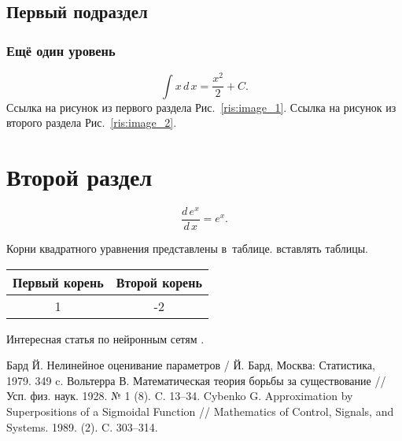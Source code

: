 \documentclass{bacgost}
\begin{document}
\subsection{Первый подраздел}

\subsubsection{Ещё один уровень}
\[
\int x\,d\,x = \dfrac{x^2}{2} + C.
\]
Ссылка на рисунок из первого раздела Рис.~\ref{ris:image_1}.
Ссылка на рисунок из второго раздела Рис.~\ref{ris:image_2}.


\section{Второй раздел}
\[
\dfrac{d\,e^x}{d\,x} = e^x.
\]
\begin{gostfigure}
	\begin{center}
		\label{ris:image_2}
	\end{center}
\end{gostfigure}

Корни квадратного уравнения представлены в~таблице. вставлять таблицы.
\begin{gosttable}
	\begin{center}
		\begin{tabular}{|c|c|}
			\hline
			Первый корень &  Второй корень \\
			\hline
			1 & -2  \\
			\hline
		\end{tabular}
	\end{center}
\end{gosttable}

Интересная статья по нейронным сетям \cite{Cybenko}.


\begin{gostbibliography}{11}
 Бард Й. Нелинейное оценивание параметров / Й. Бард, Москва: Статистика, 1979. 349 c.
 Вольтерра В. Математическая теория борьбы за существование // Усп. физ. наук. 1928. № 1 (8). C. 13–34.
 Cybenko G. Approximation by Superpositions of a Sigmoidal Function // Mathematics of Control, Signals, and Systems. 1989. (2). C. 303–314.
\end{gostbibliography}
\end{document}
